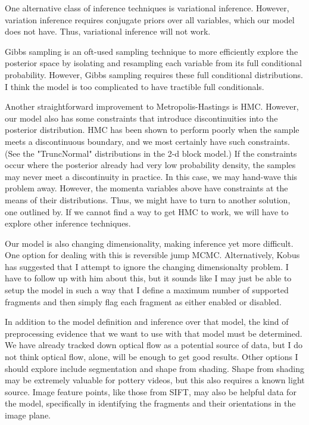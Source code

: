 \documentclass[10pt,twocolumn,letterpaper]{article}
\begin{document}
One alternative class of inference techniques is variational 
inference. However, variation inference requires conjugate priors over all 
variables, which our model does not have. Thus, variational inference will not 
work.

Gibbs sampling is an oft-used sampling technique to more efficiently explore the 
posterior space by isolating and resampling each variable from its 
full conditional probability. However, Gibbs sampling requires these full 
conditional distributions. I think the model is too complicated to have 
tractible full conditionals.

Another straightforward improvement to Metropolis-Hastings is HMC. However, our 
model also has some constraints that introduce discontinuities into the 
posterior distribution. HMC has been shown to perform poorly when the sample 
meets a discontinuous boundary, and we most certainly have such constraints. 
(See the "TruncNormal" distributions in the 2-d block model.) If the
constraints occur where the posterior already had very low probability density,  
the samples may never meet a discontinuity in practice. In this case, we may 
hand-wave this problem away. However, the momenta variables above have 
constraints at the means of their distributions. Thus, we might have to turn to 
another solution, one outlined by.\cite{NIPS2015_5801} If we 
cannot find a way to 
get HMC to work, we will have to explore other inference techniques.

Our model is also changing dimensionality, making inference yet more 
difficult. One option for dealing with this is reversible jump MCMC. 
Alternatively, Kobus has 
suggested that I attempt to ignore the changing dimensionalty problem. I have 
to follow up with him about this, but it sounds like I may just be able to setup 
the model in such a way that I define a maximum number of supported fragments 
and then simply flag each fragment as either enabled or disabled.

In addition to the model definition and inference over that model, the kind of 
preprocessing evidence that we want to use with that model must be determined. 
We have already tracked down optical flow as a potential source of data, but 
I do not think optical flow, alone, will be enough to get good results. Other 
options I should explore include segmentation and shape from shading. Shape 
from shading may be extremely valuable for pottery videos, but this also 
requires a known light source. Image feature points, like those from SIFT, 
may also be helpful data for the model, specifically in identifying the fragments 
and their orientations in the image plane.
\end{document}
